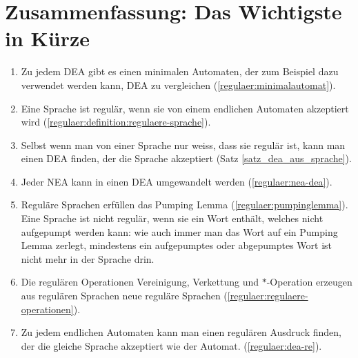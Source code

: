 \section{Zusammenfassung: Das Wichtigste in Kürze}
\begin{enumerate}
\item Zu jedem DEA gibt es einen
minimalen Automaten, der zum Beispiel dazu verwendet werden kann,
DEA zu vergleichen
(\ref{regulaer:minimalautomat}).
\item Eine Sprache ist regulär, wenn sie von einem endlichen Automaten
akzeptiert wird (\ref{regulaer:definition:regulaere-sprache}).
\item Selbst wenn man von einer Sprache nur weiss, dass sie regulär
ist, kann man einen DEA finden, der die Sprache akzeptiert
(Satz \ref{satz_dea_aus_sprache}).
\item Jeder NEA kann in einen DEA umgewandelt werden (\ref{regulaer:nea-dea}).
\item Reguläre Sprachen erfüllen das Pumping Lemma
(\ref{regulaer:pumpinglemma}).
Eine Sprache ist nicht regulär, wenn sie ein Wort enthält, welches
nicht aufgepumpt werden kann: wie auch immer man das Wort
auf ein Pumping Lemma zerlegt, mindestens ein aufgepumptes
oder abgepumptes Wort ist nicht mehr in der Sprache drin.
\item Die regulären Operationen Vereinigung, Verkettung und $*$-Operation
erzeugen aus regulären Sprachen neue reguläre Sprachen
(\ref{regulaer:regulaere-operationen}).
\item Zu jedem endlichen Automaten kann man einen regulären Ausdruck
finden, der die gleiche Sprache akzeptiert wie der Automat.
(\ref{regulaer:dea-re}).
\end{enumerate}
